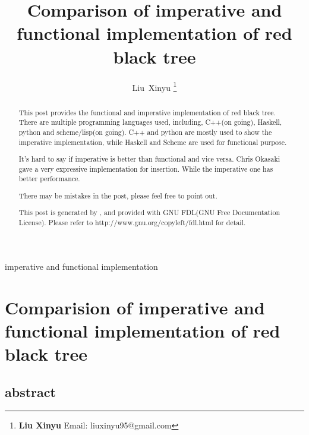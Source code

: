 \documentclass{article}
\begin{document}
\fi


\title{Comparison of imperative and functional implementation of red black tree}

\author{Liu~Xinyu
\thanks{{\bfseries Liu Xinyu } \newline
  Email: liuxinyu95@gmail.com \newline}
  }

{imperative and functional implementation}

\maketitle

\ifx\wholebook\relax
\chapter{Comparision of imperative and functional implementation of red black tree}

\section{abstract}
\else
\begin{abstract}
\fi
This post provides the functional and imperative implementation of red black tree. There are
multiple programming languages used, including, C++(on going), Haskell, python and scheme/lisp(on going).
C++ and python are mostly used to show the imperative implementation, while Haskell and Scheme are
used for functional purpose.

It's hard to say if imperative is better than functional and vice versa. Chris Okasaki gave a very expressive implementation for insertion\cite{okasai}. While the imperative one has better performance.

There may be mistakes in the post, please feel free to point out.

This post is generated by \LaTeXe, and provided with GNU FDL(GNU Free Documentation License).
Please refer to http://www.gnu.org/copyleft/fdl.html for detail.

\ifx\wholebook\relax\else
\end{abstract}
\fi
\end{document}
